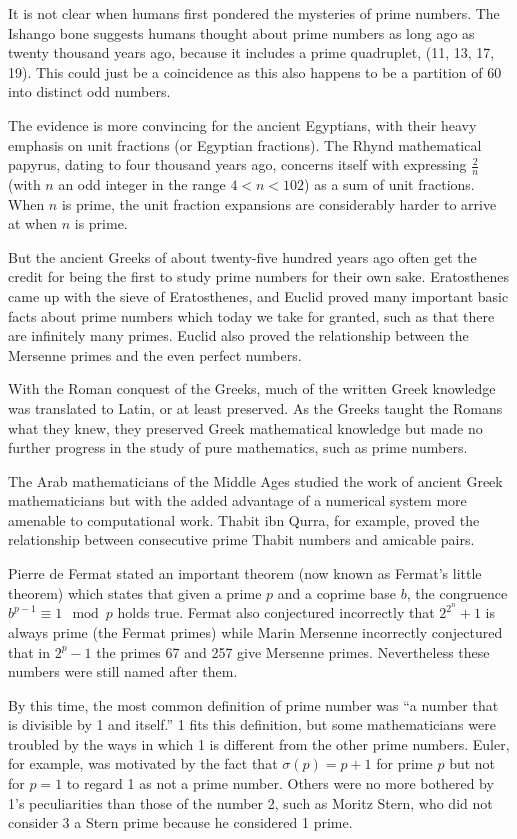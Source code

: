 \documentclass[12pt]{article}
\begin{document}

It is  not clear when humans first pondered the mysteries of prime numbers. The Ishango bone suggests humans thought about prime numbers as long ago as twenty thousand years ago, because it includes a prime quadruplet, (11, 13, 17, 19). This could just be a coincidence as this also happens to be a partition of 60 into distinct odd numbers.

The evidence is more convincing for the ancient Egyptians, with their heavy emphasis on unit fractions (or Egyptian fractions). The Rhynd mathematical papyrus, dating to four thousand years ago, concerns itself with expressing $\frac{2}{n}$ (with $n$ an odd integer in the range $4 < n < 102$) as a sum of unit fractions. When $n$ is prime, the unit fraction expansions are considerably harder to arrive at when $n$ is prime.

But the ancient Greeks of about twenty-five hundred years ago often get the credit for being the first to study prime numbers for their own sake. Eratosthenes came up with the sieve of Eratosthenes, and Euclid proved many important basic facts about prime numbers which today we take for granted, such as that there are infinitely many primes. Euclid also proved the relationship between the Mersenne primes and the even perfect numbers. 

With the Roman conquest of the Greeks, much of the written Greek knowledge was translated to Latin, or at least preserved.  As the Greeks taught the Romans what they knew, they preserved Greek mathematical knowledge but made no further progress in the study of pure mathematics, such as prime numbers.

The Arab mathematicians of the Middle Ages studied the work of ancient Greek mathematicians but with the added advantage of a numerical system more amenable to computational work. Thabit ibn Qurra, for example, proved the relationship between consecutive prime Thabit numbers and amicable pairs.

Pierre de Fermat stated an important theorem (now known as Fermat's little theorem) which states that given a prime $p$ and a coprime base $b$, the congruence $b^{p - 1} \equiv 1 \mod p$ holds true. Fermat also conjectured incorrectly that $2^{2^n} + 1$ is always prime (the Fermat primes) while Marin Mersenne incorrectly conjectured that in $2^p - 1$ the primes 67 and 257 give Mersenne primes. Nevertheless these numbers were still named after them.

By this time, the most common definition of prime number was ``a number that is divisible by 1 and itself.'' 1 fits this definition, but some mathematicians were troubled by the ways in which 1 is different from the other prime numbers. Euler, for example, was motivated by the fact that $\sigma(p) = p + 1$ for prime $p$ but not for $p = 1$ to regard 1 as not a prime number. Others were no more bothered by 1's peculiarities than those of the number 2, such as Moritz Stern, who did not consider 3 a Stern prime because he considered 1 prime.
\end{document}
